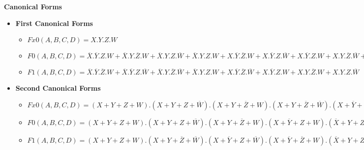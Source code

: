 \textbf{Canonical Forms }
\begin{itemize}
\item \textbf{First Canonical Forms }
    \begin{itemize}
    
        \item $Fx0(A,B,C,D) =  X.Y.Z.W$
    
        \item $F0(A,B,C,D) =  \overline{X}.\overline{Y}.Z.W + \overline{X}.Y.\overline{Z}.W + \overline{X}.Y.Z.\overline{W} + \overline{X}.Y.Z.W + X.\overline{Y}.\overline{Z}.W + X.\overline{Y}.Z.\overline{W} + X.\overline{Y}.Z.W + X.Y.\overline{Z}.\overline{W} + X.Y.\overline{Z}.W + X.Y.Z.\overline{W}$
    
        \item $F1(A,B,C,D) =  \overline{X}.\overline{Y}.\overline{Z}.W + \overline{X}.\overline{Y}.Z.\overline{W} + \overline{X}.Y.\overline{Z}.\overline{W} + \overline{X}.Y.Z.W + X.\overline{Y}.\overline{Z}.\overline{W} + X.\overline{Y}.Z.W + X.Y.\overline{Z}.W + X.Y.Z.\overline{W}$
    
    \end{itemize}

\item \textbf{Second Canonical Forms }
    \begin{itemize}
    
        \item $Fx0(A,B,C,D) =  (X+Y+Z+W) . (X+Y+Z+\overline{W}) . (X+Y+\overline{Z}+W) . (X+Y+\overline{Z}+\overline{W}) . (X+\overline{Y}+Z+W) . (X+\overline{Y}+Z+\overline{W}) . (X+\overline{Y}+\overline{Z}+W) . (X+\overline{Y}+\overline{Z}+\overline{W}) . (\overline{X}+Y+Z+W) . (\overline{X}+Y+Z+\overline{W}) . (\overline{X}+Y+\overline{Z}+W) . (\overline{X}+Y+\overline{Z}+\overline{W}) . (\overline{X}+\overline{Y}+Z+W) . (\overline{X}+\overline{Y}+Z+\overline{W}) . (\overline{X}+\overline{Y}+\overline{Z}+W)$
    
        \item $F0(A,B,C,D) =  (X+Y+Z+W) . (X+Y+Z+\overline{W}) . (X+Y+\overline{Z}+W) . (X+\overline{Y}+Z+W) . (\overline{X}+Y+Z+W) . (\overline{X}+\overline{Y}+\overline{Z}+\overline{W})$
    
        \item $F1(A,B,C,D) =  (X+Y+Z+W) . (X+Y+\overline{Z}+\overline{W}) . (X+\overline{Y}+Z+\overline{W}) . (X+\overline{Y}+\overline{Z}+W) . (\overline{X}+Y+Z+\overline{W}) . (\overline{X}+Y+\overline{Z}+W) . (\overline{X}+\overline{Y}+Z+W) . (\overline{X}+\overline{Y}+\overline{Z}+\overline{W})$
    

\end{itemize}
\end{itemize}
